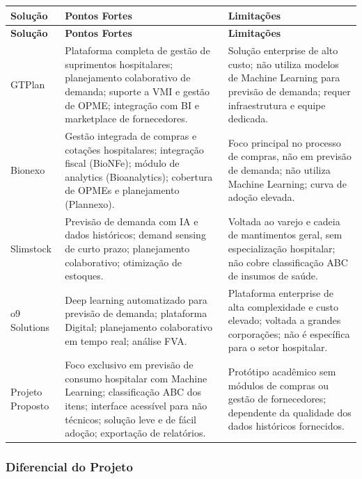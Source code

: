 \documentclass[12pt,a4paper]{article}
\begin{document}
\begin{center}
\begin{longtable}{p{} p{} p{}}
\toprule
\textbf{Solução} & \textbf{Pontos Fortes} & \textbf{Limitações} \\
\midrule
\endfirsthead
\toprule
\textbf{Solução} & \textbf{Pontos Fortes} & \textbf{Limitações} \\
\midrule
\endhead
GTPlan &
Plataforma completa de gestão de suprimentos hospitalares; planejamento colaborativo de demanda; suporte a VMI e gestão de OPME; integração com BI e marketplace de fornecedores. &
Solução enterprise de alto custo; não utiliza modelos de Machine Learning para previsão de demanda; requer infraestrutura e equipe dedicada. \\
\midrule
Bionexo &
Gestão integrada de compras e cotações hospitalares; integração fiscal (BioNFe); módulo de analytics (Bioanalytics); cobertura de OPMEs e planejamento (Plannexo). &
Foco principal no processo de compras, não em previsão de demanda; não utiliza Machine Learning; curva de adoção elevada. \\
\midrule
Slimstock &
Previsão de demanda com IA e dados históricos; demand sensing de curto prazo; planejamento colaborativo; otimização de estoques. &
Voltada ao varejo e cadeia de mantimentos geral, sem especialização hospitalar; não cobre classificação ABC de insumos de saúde. \\
\midrule
o9 Solutions &
Deep learning automatizado para previsão de demanda; plataforma Digital; planejamento colaborativo em tempo real; análise FVA. &
Plataforma enterprise de alta complexidade e custo elevado; voltada a grandes corporações; não é específica para o setor hospitalar. \\
\midrule
Projeto Proposto &
Foco exclusivo em previsão de consumo hospitalar com Machine Learning; classificação ABC dos itens; interface acessível para não técnicos; solução leve e de fácil adoção; exportação de relatórios. &
Protótipo acadêmico sem módulos de compras ou gestão de fornecedores; dependente da qualidade dos dados históricos fornecidos. \\
\bottomrule
\end{longtable}
\end{center}

\subsubsection{Diferencial do Projeto}
\end{document}
